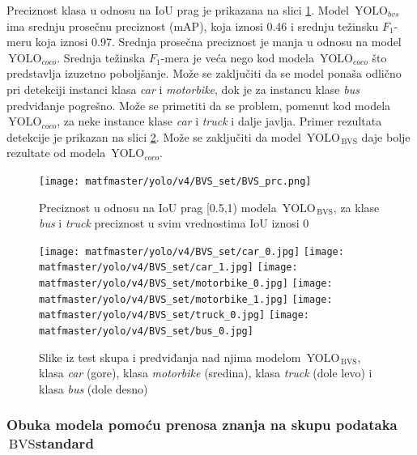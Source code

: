 \documentclass[12pt,oneside]{memoir}
\newcommand{\yolo}{\ensuremath{\,\textrm{YOLO}}}
\newcommand{\bvs}{\ensuremath{\,\textrm{BVS}}}
\begin{document}
Preciznost klasa u odnosu na IoU prag je prikazana na slici \ref{fig:YOLO4_BVS_prc}. Model $\yolo_{bvs}$ ima srednju prosečnu preciznost (mAP), koja iznosi 0.46 i srednju težinsku $F_1$-meru koja iznosi 0.97. 
Srednja prosečna preciznost je manja u odnosu na model $\yolo_{coco}$. Srednja težinska $F_1$-mera je veća nego kod modela $\yolo_{coco}$ što predstavlja izuzetno poboljšanje. Može se zaključiti da se model ponaša odlično pri detekciji instanci klasa \textit{car} i \textit{motorbike}, dok je za instancu klase \textit{bus} predviđanje pogrešno. Može se primetiti da se problem, pomenut kod modela $\yolo_{coco}$, za neke instance klase \textit{car} i \textit{truck} i dalje javlja. Primer rezultata detekcije je prikazan na slici \ref{fig:YOLO4_BVS_predictions}. Može se zaključiti da model $\yolo_{\bvs}$ daje bolje rezultate od modela $\yolo_{coco}$.



\begin{figure}[!ht]
    \centering
    \texttt{[image: matfmaster/yolo/v4/BVS\_set/BVS\_prc.png]}
    \caption{Preciznost u odnosu na IoU prag [0.5,1) modela $\yolo_{\bvs}$, za klase \textit{bus} i \textit{truck} preciznost u svim vrednostima IoU iznosi 0}
    \label{fig:YOLO4_BVS_prc}
\end{figure}


\begin{figure}[!htbp]
\centering
  \texttt{[image: matfmaster/yolo/v4/BVS\_set/car\_0.jpg]}
  \texttt{[image: matfmaster/yolo/v4/BVS\_set/car\_1.jpg]}
  \texttt{[image: matfmaster/yolo/v4/BVS\_set/motorbike\_0.jpg]}
  \texttt{[image: matfmaster/yolo/v4/BVS\_set/motorbike\_1.jpg]}
  \texttt{[image: matfmaster/yolo/v4/BVS\_set/truck\_0.jpg]}
  \texttt{[image: matfmaster/yolo/v4/BVS\_set/bus\_0.jpg]}
\caption{Slike iz test skupa i predviđanja nad njima modelom $\yolo_{\bvs}$, klasa \textit{car} (gore), klasa \textit{motorbike} (sredina), klasa \textit{truck} (dole levo) i klasa \textit{bus} (dole desno)}
\label{fig:YOLO4_BVS_predictions}
\end{figure}



\clearpage
\subsubsection{Obuka modela pomoću prenosa znanja na skupu podataka \bvs{standard}}
\end{document}
